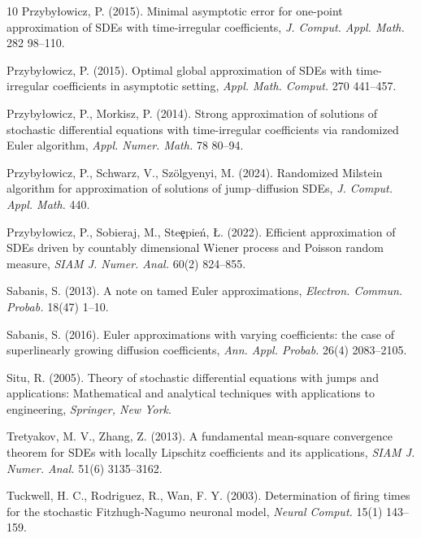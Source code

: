\documentclass[reqno,  oneside, 12pt]{amsart}
\begin{document}
\begin{thebibliography}{10}
		Przyby{\l}owicz, P. (2015). Minimal asymptotic error for one-point approximation of SDEs with time-irregular coefficients, \emph{J. Comput. Appl. Math.} 282 98--110.
		
		Przyby{\l}owicz, P. (2015). Optimal global approximation of SDEs with time-irregular coefficients in asymptotic setting, \emph{Appl. Math. Comput.} 270 441--457.
		
		Przyby{\l}owicz, P., Morkisz, P. (2014). Strong approximation of solutions of stochastic differential equations with time-irregular coefficients via randomized Euler algorithm, \emph{Appl. Numer. Math.} 78 80--94.
		
		Przyby{\l}owicz, P., Schwarz, V., Szölgyenyi, M. (2024). Randomized Milstein algorithm for approximation of solutions of jump–diffusion SDEs, \emph{J. Comput. Appl. Math.} 440.
		
		Przyby{\l}owicz, P., Sobieraj, M., Ste\c epie\'n, {\L}. (2022). Efficient approximation of SDEs driven by countably dimensional Wiener process and Poisson random measure, \emph{SIAM J. Numer. Anal.} 60(2) 824--855.
		
		Sabanis, S. (2013). A note on tamed Euler approximations, \emph{Electron. Commun. Probab.} 18(47) 1--10.
		
	{Sabanis, S. (2016). Euler approximations with varying coefficients: the case of superlinearly growing diffusion coefficients, \emph{Ann. Appl. Probab.} 26(4) 2083--2105.}
		
		Situ, R. (2005). Theory of stochastic differential equations with jumps and applications: Mathematical and analytical techniques with applications to engineering, \emph{Springer, New York}.
		
		Tretyakov, M. V., Zhang, Z. (2013). A fundamental mean-square convergence theorem for SDEs with locally Lipschitz coefficients and its applications, \emph{SIAM J. Numer. Anal.} 51(6) 3135--3162.
		
		Tuckwell, H. C., Rodriguez, R., Wan, F. Y. (2003). Determination of firing times for the stochastic Fitzhugh-Nagumo neuronal model, \emph{Neural Comput.} 15(1) 143--159.
		
	\end{thebibliography}
	
	
\end{document}
